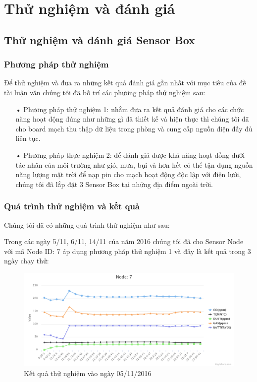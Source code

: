 \section{Thử nghiệm và đánh giá}
\subsection{Thử nghiệm và đánh giá Sensor Box}
\subsubsection*{Phương pháp thử nghiệm}
Để thử nghiệm và đưa ra những kết quả đánh giá gần nhất với mục tiêu của đề tài luận văn chúng tôi đã bố trí các phương pháp thử nghiệm sau:
\begin{itemize}
\item[•] Phương pháp thử nghiệm 1: nhằm đưa ra kết quả đánh giá cho các chức năng hoạt động đúng như những gì đã thiết kế và hiện thực thì chúng tôi đã cho board mạch thu thập dữ liệu trong phòng và cung cấp nguồn điện đầy đủ liên tục.
\item[•] Phương pháp thực nghiệm 2: để đánh giá được khả năng hoạt đồng dưới tác nhân của môi trường như gió, mưa, bụi và hơn hết có thể tận dụng nguồn năng lượng mặt trời để nạp pin cho mạch hoạt động độc lập với điện lưới, chúng tôi đã lắp đặt 3 Sensor Box tại những địa điểm ngoài trời.

\end{itemize}

\subsubsection*{Quá trình thử nghiệm và kết quả}
Chúng tôi đã có những quá trình thử nghiệm như sau:

Trong các ngày 5/11, 6/11, 14/11 của năm 2016 chúng tôi đã cho Sensor Node với mã Node ID: 7 áp dụng phương pháp thử nghiệm 1 và đây là kết quả trong 3 ngày chạy thử:
\begin{figure}[H]
	\centering    
	\includegraphics[width=6in]{5nov}
	\caption[Kết quả thử nghiệm vào ngày 05/11/2016]{Kết quả thử nghiệm vào ngày 05/11/2016}
	\label{fig:5nov}
\end{figure}

